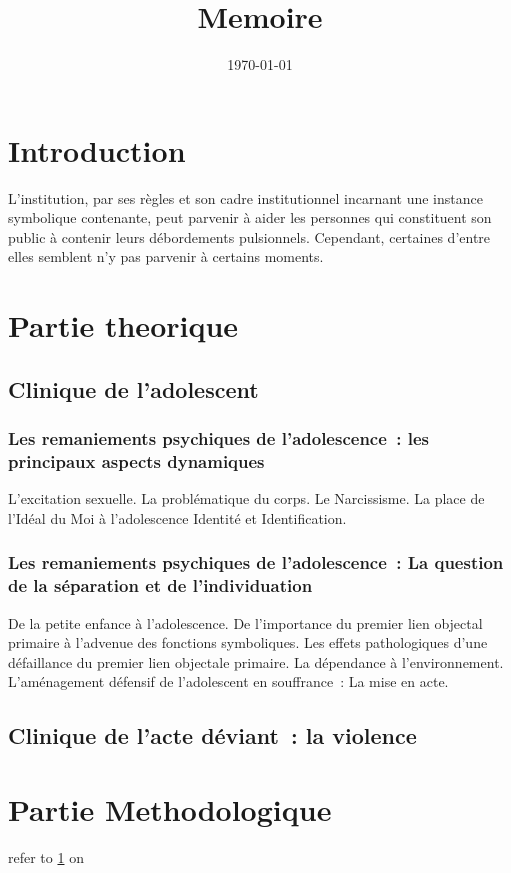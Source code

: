 \documentclass[a4paper, 12pt]{article}
\begin{document}
\title{Memoire}
\author{}
\date{\today}
\maketitle

\section{Introduction}
\label{intro}
L’institution, par ses règles et son cadre institutionnel incarnant une instance symbolique contenante, peut parvenir à aider les personnes qui constituent son  public à contenir leurs débordements pulsionnels. Cependant, certaines d’entre elles semblent n’y pas parvenir à certains moments.

\section{Partie theorique}

\subsection{Clinique de l’adolescent}

\subsubsection{Les remaniements psychiques de l’adolescence : les principaux aspects dynamiques}
L’excitation sexuelle.
La problématique du corps.
Le Narcissisme.
La place de l'Idéal du Moi à l'adolescence
Identité et Identification.

\subsubsection{Les remaniements psychiques de l’adolescence : La question de la séparation et de l’individuation}
De la petite enfance à l’adolescence.
De l’importance du premier lien objectal primaire à l’advenue des fonctions symboliques.
Les effets pathologiques d’une défaillance du premier lien objectale primaire.
La dépendance à l’environnement.
L’aménagement défensif de l’adolescent en souffrance : La mise en acte.

\subsection{Clinique de l’acte déviant : la violence}

\section{Partie Methodologique}
refer to \ref{intro} on \pageref{intro}
\end{document}
